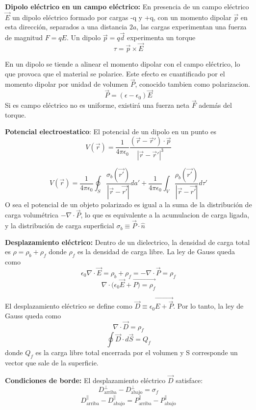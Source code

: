 \documentclass[a4paper, 10pt]{article}
\begin{document}
\begin{multicols*}{2}
	\textbf{Dipolo eléctrico en un campo eléctrico:} En presencia de un campo eléctrico $\vec{E}$ un dipolo eléctrico formado por cargas -q y +q, con un momento dipolar $\vec{p}$ en esta dirección, separados a una distancia $2a$, las cargas experimentan una fuerza de magnitud $F=qE$. Un dipolo $\vec{p} =q \vec{d}$ experimenta un torque 
	$$\tau = \vec{p} \times \vec{E}$$
	    
	En un dipolo se tiende a alinear el momento dipolar con el campo eléctrico, lo que provoca que el material se polarice. Este efecto es cuantificado por el momento dipolar por unidad de volumen $\vec{P}$, conocido tambien como polarizacion.
	$$\vec{P} = (\epsilon - \epsilon_0) \vec{E}$$
	Si es campo eléctrico no es uniforme, existirá una fuerza neta $\vec{F}$ además del torque.
	    
	\textbf{Potencial electroestatico}: El potencial de un dipolo en un punto es 
	$$V(\vec{r})=\frac{1}{4 \pi \epsilon_0} \frac{(\vec{r}- \vec{r}') \cdot \vec{p}}{|\vec{r}- \vec{r}'|^3}$$
	    
	$$V(\vec{r}) = \frac{1}{4 \pi \epsilon_0} \oint_S \frac{\sigma_b (\vec{r'})}{|\vec{r}-\vec{r'}|}da' + \frac{1}{4 \pi \epsilon_0} \int_V \frac{\rho_b(\vec{r'})}{|\vec{r}-\vec{r'}|} d \tau '$$
	O sea el potencial de un objeto polarizado es igual a la suma de la distribución de carga volumétrica $-\nabla \cdot \vec{P}$, lo que es equivalente a la acumulacion de carga ligada, y la distribución de carga superficial $\sigma_b \equiv \vec{P} \cdot \hat{n}$
	    
	\textbf{Desplazamiento eléctrico:} Dentro de un dielectrico, la densidad de carga total es $\rho = \rho_b + \rho_f$ donde $\rho_f$ es la densidad de carga libre.
	La ley de Gauss queda como 
	$$\epsilon_0 \nabla \cdot \vec{E} = \rho _b + \rho_f = - \nabla \cdot \vec{P} = \rho _f$$
	$$\nabla \cdot (\epsilon_0 \vec{E} + \vec{P) = \rho _f}$$
	    
	El desplazamiento eléctrico se define como $\vec{D} \equiv \epsilon_0 \vec{E + \vec{P}}$. Por lo tanto, la ley de Gauss queda como
	$$\nabla \cdot \vec{D} = \rho_f$$
	$$\oint \vec{D} \cdot d\vec{S}= Q_f$$
	donde $Q_f $ es la carga libre total encerrada por el volumen y S corresponde un vector que sale de la superficie.
	    
	\textbf{Condiciones de borde:} El desplazamiento eléctrico $\vec{D}$ satisface:
	$$D_{\text{arriba}}^{\perp} - D_{\text{abajo}}^{\perp}=\sigma _f$$
	$$D_{\text{arriba}}^{\parallel} - D_{\text{abajo}}^{\parallel}=P_{\text{arriba}}^{\parallel} - P_{\text{abajo}}^{\parallel}$$
	    

\end{multicols*}
\end{document}
